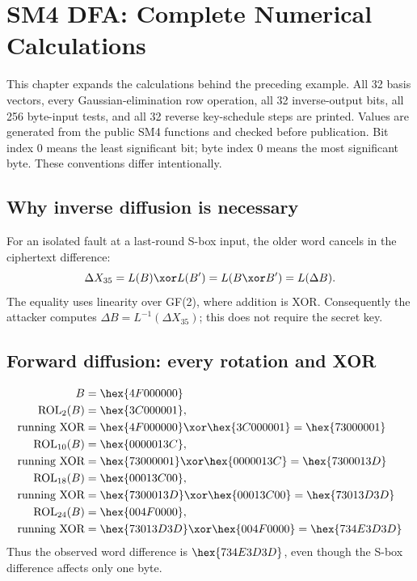 \chapter{SM4 DFA: Complete Numerical Calculations}
\label{chap:complete_calculations}
This chapter expands the calculations behind the preceding example. All 32 basis vectors, every Gaussian-elimination row operation, all 32 inverse-output bits, all 256 byte-input tests, and all 32 reverse key-schedule steps are printed. Values are generated from the public SM4 functions and checked before publication. Bit index 0 means the least significant bit; byte index 0 means the most significant byte. These conventions differ intentionally.
\section{Why inverse diffusion is necessary}
For an isolated fault at a last-round S-box input, the older word cancels in the ciphertext difference:
\[\Delta X_{35}=L(B)\xor L(B')=L(B\xor B')=L(\Delta B).\]
The equality uses linearity over GF(2), where addition is XOR. Consequently the attacker computes $\Delta B=L^{-1}(\Delta X_{35})$; this does not require the secret key.
\section{Forward diffusion: every rotation and XOR}
\begin{align*}B&=\hex{4F000000}\\
\operatorname{ROL}_{2}(B)&=\hex{3C000001},\\
\text{running XOR}&=\hex{4F000000}\xor\hex{3C000001}=\hex{73000001}\\
\operatorname{ROL}_{10}(B)&=\hex{0000013C},\\
\text{running XOR}&=\hex{73000001}\xor\hex{0000013C}=\hex{7300013D}\\
\operatorname{ROL}_{18}(B)&=\hex{00013C00},\\
\text{running XOR}&=\hex{7300013D}\xor\hex{00013C00}=\hex{73013D3D}\\
\operatorname{ROL}_{24}(B)&=\hex{004F0000},\\
\text{running XOR}&=\hex{73013D3D}\xor\hex{004F0000}=\hex{734E3D3D}\\
\end{align*}
Thus the observed word difference is $\hex{734E3D3D}$, even though the S-box difference affects only one byte.
